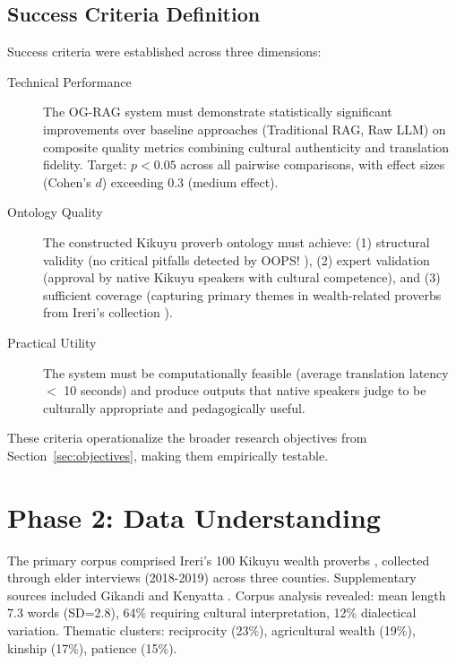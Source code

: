\subsection{Success Criteria Definition}
\label{subsec:success_criteria}

Success criteria were established across three dimensions:

\begin{description}
    \item[Technical Performance] The OG-RAG system must demonstrate statistically significant improvements over baseline approaches (Traditional RAG, Raw LLM) on composite quality metrics combining cultural authenticity and translation fidelity. Target: $p < 0.05$ across all pairwise comparisons, with effect sizes (Cohen's $d$) exceeding 0.3 (medium effect).
    
    \item[Ontology Quality] The constructed Kikuyu proverb ontology must achieve: (1) structural validity (no critical pitfalls detected by OOPS! \cite{poveda2014oops}), (2) expert validation (approval by native Kikuyu speakers with cultural competence), and (3) sufficient coverage (capturing primary themes in wealth-related proverbs from Ireri's collection \cite{ireri2019proverbs}).
    
    \item[Practical Utility] The system must be computationally feasible (average translation latency $<$ 10 seconds) and produce outputs that native speakers judge to be culturally appropriate and pedagogically useful.
\end{description}

These criteria operationalize the broader research objectives from Section~\ref{sec:objectives}, making them empirically testable.

\section{Phase 2: Data Understanding}
\label{sec:phase_data_understanding}

The primary corpus comprised Ireri's 100 Kikuyu wealth proverbs \cite{ireri2019proverbs}, collected through elder interviews (2018-2019) across three counties. Supplementary sources included Gikandi \cite{gikandi2005thousand} and Kenyatta \cite{kenyatta1938facing}. Corpus analysis revealed: mean length 7.3 words (SD=2.8), 64\% requiring cultural interpretation, 12\% dialectical variation. Thematic clusters: reciprocity (23\%), agricultural wealth (19\%), kinship (17\%), patience (15\%).

